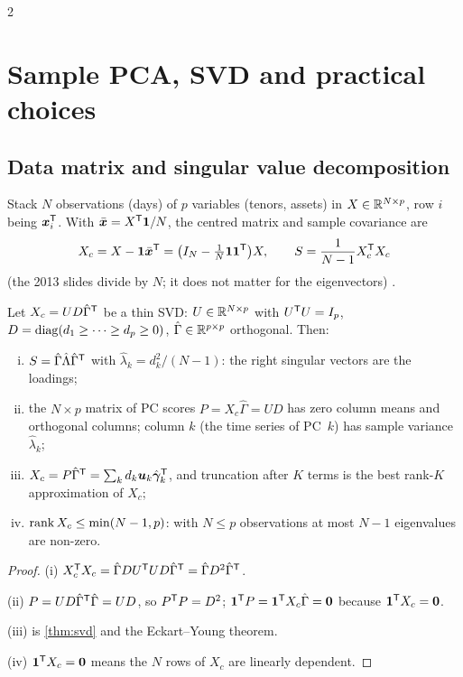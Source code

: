 \begin{paracol}{2}
\section{Sample PCA, SVD and practical choices}\label{ch07:sec-sample}

\subsection{Data matrix and singular value decomposition}
Stack $N$ observations (days) of $p$ variables (tenors, assets) in $X\in\mathbb{R}^{N\times p}$, row $i$ being $\bm x_i^{\mathsf T}$.
With $\bar{\bm x}=X^{\mathsf T}\bm1/N$, the centred matrix and sample covariance are
\[
  X_c=X-\bm 1\bar{\bm x}^{\mathsf T}=\bigl(I_N-\tfrac1N\bm1\bm1^{\mathsf T}\bigr)X,\qquad S=\frac{1}{N-1}X_c^{\mathsf T} X_c
\]
(the 2013 slides divide by $N$; it does not matter for the eigenvectors) .

\begin{proposition}\label{ch07:prop-svd}
Let $X_c=UD\hat\Gamma^{\mathsf T}$ be a thin SVD: $U\in\mathbb{R}^{N\times p}$ with $U^{\mathsf T} U=I_p$, $D=\operatorname{diag}(d_1\ge\dots\ge d_p\ge0)$,
$\hat\Gamma\in\mathbb{R}^{p\times p}$ orthogonal. Then:
\begin{enumerate}[(i)]
  \item $S=\hat\Gamma\hat\Lambda\hat\Gamma^{\mathsf T}$ with $\hat\lambda_k=d_k^2/(N-1)$: the right singular vectors are the loadings;
  \item the $N\times p$ matrix of PC scores $P=X_c\hat\Gamma=UD$ has zero column means and orthogonal columns;
        column $k$ (the time series of PC~$k$) has sample variance $\hat\lambda_k$;
  \item $X_c=P\hat\Gamma^{\mathsf T}=\sum_kd_k\bm u_k\hat{\bm\gamma}_k^{\mathsf T}$, and truncation after $K$ terms is the best rank-$K$
        approximation of $X_c$;
  \item $\operatorname{rank} X_c\le\min(N-1,p)$: with $N\le p$ observations at most $N-1$ eigenvalues are non-zero.
\end{enumerate}
\end{proposition}
\begin{proof}
(i) $X_c^{\mathsf T} X_c=\hat\Gamma DU^{\mathsf T} UD\hat\Gamma^{\mathsf T}=\hat\Gamma D^2\hat\Gamma^{\mathsf T}$.

(ii) $P=UD\hat\Gamma^{\mathsf T}\hat\Gamma=UD$, so
$P^{\mathsf T} P=D^2$; $\bm1^{\mathsf T} P=\bm1^{\mathsf T} X_c\hat\Gamma=\bm0$ because $\bm1^{\mathsf T} X_c=\bm 0$.

(iii) is \cref{thm:svd} and the Eckart--Young
theorem.

(iv) $\bm1^{\mathsf T} X_c=\bm0$ means the $N$ rows of $X_c$ are linearly dependent.
\end{proof}


\end{paracol}
